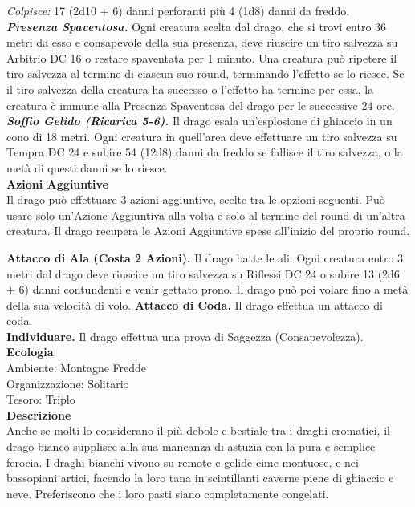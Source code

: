 \begin{multicols}{2}
\emph{Colpisce:} 17 (2d10 + 6) danni perforanti più 4 (1d8) danni da freddo.\\
\emph{\textbf{Presenza Spaventosa.}} Ogni creatura scelta dal drago, che si trovi entro 36 metri da esso e consapevole della sua presenza, deve riuscire un tiro salvezza su Arbitrio DC  16 o restare spaventata per 1 minuto. Una creatura può ripetere il tiro salvezza al termine di ciascun suo round, terminando l'effetto se lo riesce. Se il tiro salvezza della creatura ha successo o l'effetto ha termine per essa, la creatura è immune alla Presenza Spaventosa del drago per le successive 24 ore.\\
\emph{\textbf{Soffio Gelido (Ricarica 5-6).}} Il drago esala un'esplosione di ghiaccio in un cono di 18 metri. Ogni creatura in quell'area deve effettuare un tiro salvezza su Tempra DC  24 e subire 54 (12d8) danni da freddo se fallisce il tiro salvezza, o la metà di questi danni se lo riesce.\\
\textbf{Azioni Aggiuntive} \\
Il drago può effettuare 3 azioni aggiuntive, scelte tra le opzioni seguenti. Può usare solo un'Azione Aggiuntiva alla volta e solo al termine del round di un'altra creatura. Il drago recupera le Azioni Aggiuntive spese all'inizio del proprio round.

\textbf{Attacco di Ala (Costa 2 Azioni).} Il drago batte le ali. Ogni creatura entro 3 metri dal drago deve riuscire un tiro salvezza su Riflessi DC  24 o subire 13 (2d6 + 6) danni contundenti e venir gettato prono. Il drago può poi volare fino a metà della sua velocità di volo. \textbf{Attacco di Coda.} Il drago effettua un attacco di coda. \\
\textbf{Individuare.} Il drago effettua una prova di Saggezza (Consapevolezza).
\textbf{Ecologia}\\
Ambiente: Montagne Fredde\\
Organizzazione: Solitario\\
Tesoro: Triplo\\
\textbf{Descrizione}\\
Anche se molti lo considerano il più debole e bestiale tra i draghi cromatici, il drago bianco supplisce alla sua mancanza di astuzia con la pura e semplice ferocia. I draghi bianchi vivono su remote e gelide cime montuose, e nei bassopiani artici, facendo la loro tana in scintillanti caverne piene di ghiaccio e neve. Preferiscono che i loro pasti siano completamente congelati.\\



\end{multicols}
